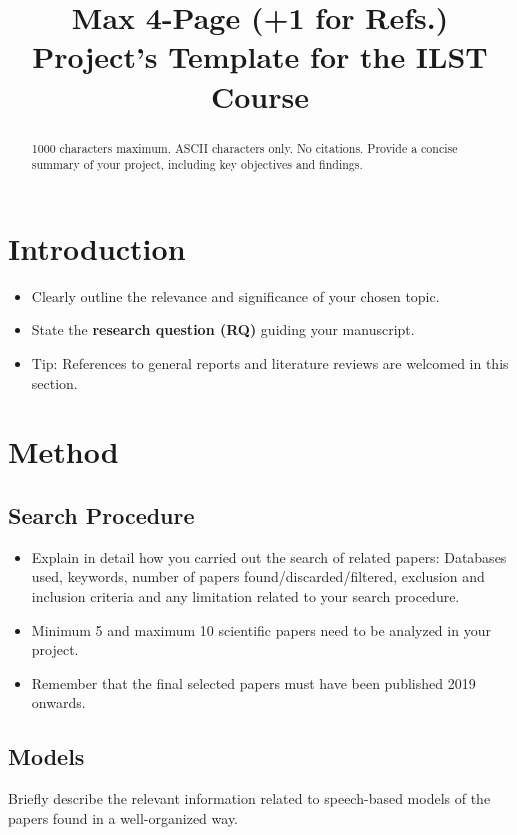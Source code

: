 \documentclass{Interspeech2024}
\title{Max 4-Page (+1 for Refs.) Project's Template for the ILST Course}
\begin{document}
\maketitle


\begin{abstract}   
    1000 characters maximum. ASCII characters only. No citations. Provide a concise summary of your project, including key objectives and findings. 
\end{abstract}



\section{Introduction}

\begin{itemize}
    \item Clearly outline the relevance and significance of your chosen topic.
    \item State the \textbf{research question (RQ)} guiding your manuscript.
    \item Tip: References to general reports and literature reviews are welcomed in this section.
\end{itemize}


\section{Method}

\subsection{Search Procedure}

\begin{itemize}
    \item Explain in detail how you carried out the search of related papers: Databases used, keywords, number of papers found/discarded/filtered, exclusion and inclusion criteria and any limitation related to your search procedure.
    \item Minimum 5 and maximum 10 scientific papers need to be analyzed in your project.
    \item Remember that the final selected papers must have been published 2019 onwards.
\end{itemize}






\subsection{Models}
Briefly describe the relevant information related to speech-based models of the papers found in a well-organized way.
\end{document}
